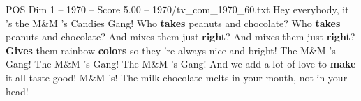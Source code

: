 \begin{textsample}{POS Dim 1 – 1970 – Score 5.00 – 1970/tv\_com\_1970\_60.txt}  \label{ex:f1_pos_034}
Hey everybody, it 's the M\&M 's Candies Gang!
Who \textbf{takes} peanuts and chocolate?
Who \textbf{takes} peanuts and chocolate?
And mixes them just \textbf{right}?
And mixes them just \textbf{right}? \textbf{Gives} them rainbow \textbf{colors} so they 're always nice and bright!
The M\&M 's Gang!
The M\&M 's Gang!
The M\&M 's Gang!
And we add a lot of love to \textbf{make} it all taste good!
M\&M 's!
The milk chocolate melts in your mouth, not in your head!

\end{textsample}
